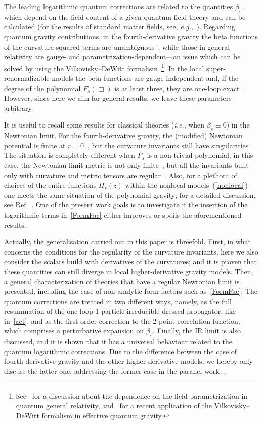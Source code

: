 \documentclass[aps,prd,a4paper,twocolumn,showpacs,showkeys,preprintnumbers,amsmath,amssymb,nofootinbib]{revtex4-2}
\numberwithin{equation}{section}
\newcommand{\eq}[1]{(\ref{#1})}
\def\be{\beta}
\begin{document}
The leading logarithmic quantum corrections are related to the quantities $\beta_s$, which depend on the field content of a given quantum field theory and can be calculated (for the results of standard matter fields, see, \textit{e.g.},~\cite{BirDav}). Regarding quantum gravity contributions, in the fourth-derivative gravity the beta functions of the curvature-squared terms are unambiguous~\cite{AvraBavi85,Shapiro:1994ww}, while those in general relativity are gauge- and parametrization-dependent---an issue which can be solved by using the Vilkovisky--DeWitt formalism~\cite{Vil-unicEA,DeWitt-ea}\footnote{See~\cite{Ohta:2016npm,Goncalves:2017jxq,Giacchini:2020dhv} for a discussion about the dependence on the field parametrization in quantum general relativity, and~\cite{Giacchini:2020zrl} for a recent application of the Vilkovisky--DeWitt formalism in effective quantum gravity.}. In the local super-renormalizable models the beta functions are gauge-independent and, if the degree of the polynomial $F_s (\Box)$ is at least three, they are one-loop exact~\cite{AsoreyLopezShapiro}. However, since here we aim for general results, we leave these parameters arbitrary.

It is useful to recall some results for classical theories ({\it i.e.}, when $\be_{s} \equiv 0$) in the Newtonian limit.
For the fourth-derivative gravity, the (modified) Newtonian potential is finite at $r=0$~\cite{Stelle77}, but the curvature invariants still have singularities~\cite{Stelle78}. The situation is completely different when $F_s$ is a non-trivial polynomial; in this case, the Newtonian-limit metric is not only finite~\cite{Newton-MNS,Newton-BLG}, but all the invariants built only with curvature and metric tensors are regular~\cite{BreTib1}.  Also, for a plethora of choices of the entire functions $H_s(z)$ within the nonlocal models~\eq{nonlocal} one meets the same situation of the polynomial gravity; for a detailed discussion, see Ref.~\cite{BreTib2}. One of the present work goals is to investigate if the insertion of the logarithmic terms in~\eqref{FormFac} either improves or spoils the aforementioned results.

Actually, the generalisation carried out in this paper is threefold. First, in what concerns the conditions for the regularity of the curvature invariants, here we also consider the scalars build with derivatives of the curvatures; and it is proven that these quantities can still diverge in local higher-derivative gravity models. Then, a general characterization of theories that have a regular Newtonian limit is presented, including the case of non-analytic form factors such as~\eqref{FormFac}. The quantum corrections are treated in two different ways, namely, as the full resummation of the one-loop 1-particle irreducible dressed propagator, like in~\eqref{act}, and as the first order
correction to the 2-point correlation function, which comprises a perturbative expansion on $\be_s$.
Finally, the IR limit is also discussed, and it is shown that it has a universal behaviour related to the quantum logarithmic corrections. Due to the difference between the case of fourth-derivative gravity and the other higher-derivative models, we hereby only discuss the latter one, addressing the former case in the parallel work~\cite{Nos4der}.
\end{document}
